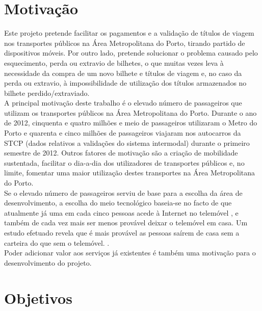 \documentclass[9pt,a4paper]{extarticle}
\begin{document}
\begin{multicols}{2}

\section{Motivação}\label{sec:motiva}

Este projeto pretende facilitar os pagamentos e a validação de títulos de viagem nos transportes públicos na Área Metropolitana do Porto, tirando partido de dispositivos móveis. Por outro lado, pretende solucionar o problema causado pelo esquecimento, perda ou extravio de bilhetes, o que muitas vezes leva à necessidade da compra de um novo bilhete e títulos de viagem e, no caso da perda ou extravio, à impossibilidade de utilização dos títulos armazenados no bilhete perdido/extraviado.
\\A principal motivação deste trabalho é o elevado número de passageiros que utilizam os transportes públicos na Área Metropolitana do Porto. Durante o ano de 2012, cinquenta e quatro milhões e meio de passageiros utilizaram o Metro do Porto \cite{INE20130528} e quarenta e cinco milhões de passageiros viajaram nos autocarros da STCP (dados relativos a validações do sistema intermodal) durante o primeiro semestre de 2012. \cite{andante} Outros fatores de motivação são a criação de mobilidade sustentada, facilitar o dia-a-dia dos utilizadores de transportes públicos e, no limite, fomentar uma maior utilização destes transportes na Área Metropolitana do Porto.
\\Se o elevado número de passageiros serviu de base para a escolha da área de desenvolvimento, a escolha do meio tecnológico baseia-se no facto de que atualmente já uma em cada cinco pessoas acede à Internet no telemóvel \cite{INE20121106}, e também de cada vez mais ser menos provável deixar o telemóvel em casa. Um estudo efetuado revela que é mais provável as pessoas saírem de casa sem a carteira do que sem o telemóvel. \cite{NFCForum2011}.
\\Poder adicionar valor aos serviços já existentes é também uma motivação para o desenvolvimento do projeto.

\section{Objetivos}\label{sec:goals}


\end{multicols}
\end{document}
